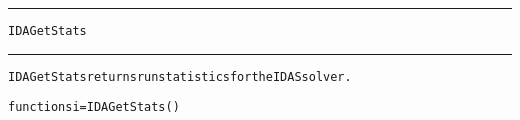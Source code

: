 \begin{samepage}
\hrule
\begin{center}
{\large \verb!IDAGetStats!}
\label{p:IDAGetStats}
\end{center}
\hrule\vspace{0.1in}



\begin{alltt}
IDAGetStats returns run statistics for the IDAS solver.
\end{alltt}

\end{samepage}



\begin{samepage}


\begin{alltt}
function si = IDAGetStats() 
\end{alltt}

\end{samepage}



